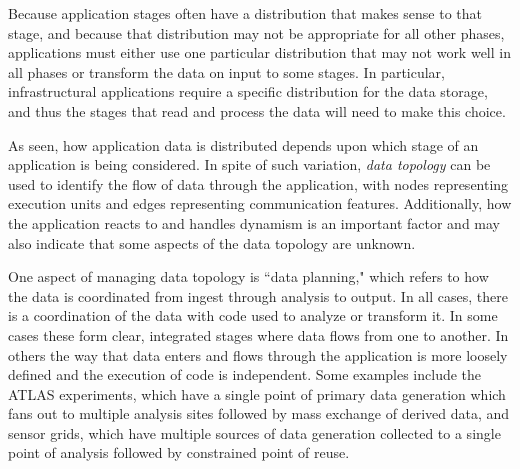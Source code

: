 

Because application stages often have a distribution that makes sense
to that stage, and because that distribution may not be appropriate for all other
phases, applications must either use one particular distribution
that may not work well in all phases or transform the data on input to
some stages.  In particular, infrastructural applications
require a specific distribution for the data storage, and thus
the stages that read and process the data will need to make this choice.

As seen, how application data is distributed depends upon which stage
of an application is being considered. In spite of such variation,
{\it data topology} can be used to identify the flow of data through
the application, with nodes representing execution units and edges
representing communication features.
Additionally, how the application reacts to and handles dynamism is an
important factor and may also indicate that some aspects of the data
topology are unknown.

One aspect of managing data topology is ``data planning," which refers
to how the data is coordinated from ingest through analysis to
output. In all cases, there is a coordination of the data with code
used to analyze or transform it. In some cases these form clear,
integrated stages where data flows from one to another. In others the
way that data enters and flows through the application is more loosely
defined and the execution of code is independent. Some examples
include the ATLAS experiments, which have a single point of primary
data generation which fans out to multiple analysis sites followed by
mass exchange of derived data, and sensor grids, which have multiple
sources of data generation collected to a single point of analysis
followed by constrained point of reuse.

